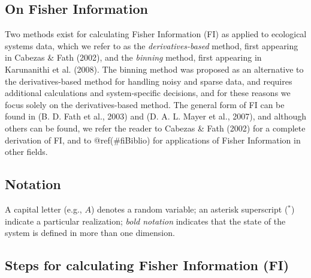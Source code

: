 \documentclass[12pt,twoside,openany]{reedthesis}
\begin{document}
\subsection{On Fisher Information}\label{on-fisher-information}

Two methods exist for calculating Fisher Information (FI) as applied to
ecological systems data, which we refer to as the
\emph{derivatives-based} method, first appearing in Cabezas \& Fath
(2002), and the \emph{binning} method, first appearing in Karunanithi et
al. (2008). The binning method was proposed as an alternative to the
derivatives-based method for handling noisy and sparse data, and
requires additional calculations and system-specific decisions, and for
these reasons we focus solely on the derivatives-based method. The
general form of FI can be found in (B. D. Fath et al., 2003) and (D. A.
L. Mayer et al., 2007), and although others can be found, we refer the
reader to Cabezas \& Fath (2002) for a complete derivation of FI, and to
@ref(\#fiBiblio) for applications of Fisher Information in other fields.

\subsection{Notation}\label{notation}

A capital letter (e.g., \(A\)) denotes a random variable; an asterisk
superscript (\(^*\)) indicate a particular realization; \emph{bold
notation} indicates that the state of the system is defined in more than
one dimension.

\subsection{Steps for calculating Fisher Information
(FI)}\label{steps-for-calculating-fisher-information-fi}
\end{document}
